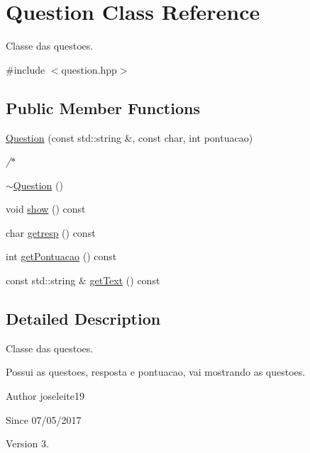 \hypertarget{class_question}{}\section{Question Class Reference}
\label{class_question}


Classe das questoes.  




{\ttfamily \#include $<$question.\+hpp$>$}

\subsection*{Public Member Functions}
\begin{DoxyCompactItemize}
\item 
\hyperlink{class_question_a324739668ea82ec4229b7a8c89215acf}{Question} (const std\+::string \&, const char, int pontuacao)
\begin{DoxyCompactList}\small\item\em /$\ast$ \end{DoxyCompactList}\item 
\hyperlink{class_question_a8d9283fb5357e39ed58a743f18629040}{$\sim$\+Question} ()
\item 
void \hyperlink{class_question_a1680a8dfef011dcf971b56ab302b3164}{show} () const
\item 
char \hyperlink{class_question_a7dbb3a08bcdb160f0f9c1b568af9fe48}{getresp} () const
\item 
int \hyperlink{class_question_abbb1bb09b9ff8bc741a15d548034a7df}{get\+Pontuacao} () const
\item 
const std\+::string \& \hyperlink{class_question_afea6ba74d117b00cd5fbca8fa1e2552c}{get\+Text} () const
\end{DoxyCompactItemize}


\subsection{Detailed Description}
Classe das questoes. 

Possui as questoes, resposta e pontuacao, vai mostrando as questoes. \begin{DoxyAuthor}{Author}
joseleite19 
\end{DoxyAuthor}
\begin{DoxySince}{Since}
07/05/2017 
\end{DoxySince}
\begin{DoxyVersion}{Version}
3. 
\end{DoxyVersion}


